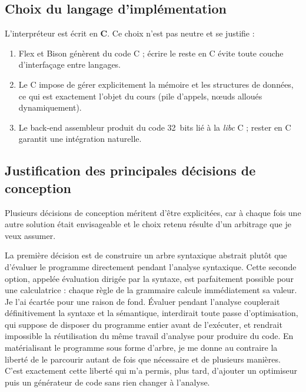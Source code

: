 \subsection{Choix du langage d'implémentation}

L'interpréteur est écrit en \textbf{C}. Ce choix n'est pas neutre et se justifie :

\begin{enumerate}
  \item Flex et Bison génèrent du code C ; écrire le reste en C évite toute
        couche d'interfaçage entre langages.
  \item Le C impose de gérer explicitement la mémoire et les structures de
        données, ce qui est exactement l'objet du cours (pile d'appels, n\oe uds
        alloués dynamiquement).
  \item Le back-end assembleur produit du code 32~bits lié à la \emph{libc} C ;
        rester en C garantit une intégration naturelle.
\end{enumerate}

\subsection{Justification des principales décisions de conception}

Plusieurs décisions de conception méritent d'être explicitées, car à chaque fois
une autre solution était envisageable et le choix retenu résulte d'un arbitrage
que je veux assumer.

La première décision est de construire un arbre syntaxique abstrait plutôt que
d'évaluer le programme directement pendant l'analyse syntaxique. Cette seconde
option, appelée évaluation dirigée par la syntaxe, est parfaitement possible pour
une calculatrice : chaque règle de la grammaire calcule immédiatement sa valeur.
Je l'ai écartée pour une raison de fond. Évaluer pendant l'analyse couplerait
définitivement la syntaxe et la sémantique, interdirait toute passe
d'optimisation, qui suppose de disposer du programme entier avant de l'exécuter,
et rendrait impossible la réutilisation du même travail d'analyse pour produire du
code. En matérialisant le programme sous forme d'arbre, je me donne au contraire
la liberté de le parcourir autant de fois que nécessaire et de plusieurs manières.
C'est exactement cette liberté qui m'a permis, plus tard, d'ajouter un optimiseur
puis un générateur de code sans rien changer à l'analyse.

